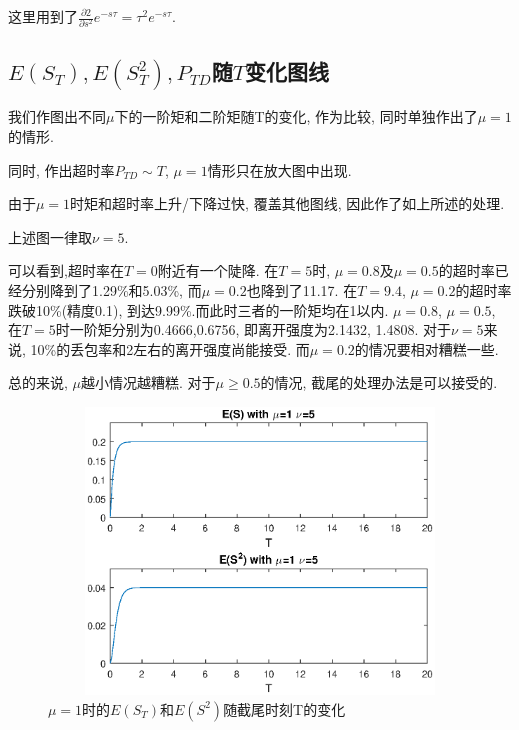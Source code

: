 \documentclass[a4paper, 12pt]{ctexart}
\begin{document}
这里用到了$\frac{\partial2}{\partial s^2}e^{-s\tau}=\tau^2e^{-s\tau}$.

\subsection{$E(S_T), E(S_T^2), P_{TD}$随$T$变化图线}

我们作图出不同$\mu$下的一阶矩和二阶矩随T的变化, 作为比较, 同时单独作出了$\mu=1$的情形. 

同时, 作出超时率$P_{TD}\sim T$, $\mu=1$情形只在放大图中出现. 

由于$\mu=1$时矩和超时率上升/下降过快, 覆盖其他图线, 因此作了如上所述的处理.

上述图一律取$\nu=5$.

可以看到,超时率在$T=0$附近有一个陡降. 在$T=5$时, $\mu=0.8$及$\mu=0.5$的超时率已经分别降到了1.29\%和5.03\%, 而$\mu=0.2$也降到了11.17. 在$T=9.4$, $\mu=0.2$的超时率跌破10\%(精度0.1), 到达9.99\%.而此时三者的一阶矩均在1以内. $\mu =0.8$, $\mu=0.5$, 在$T=5$时一阶矩分别为0.4666,0.6756, 即离开强度为2.1432, 1.4808. 对于$\nu=5$来说, 10\%的丢包率和2左右的离开强度尚能接受. 而$\mu=0.2$的情况要相对糟糕一些.  

总的来说, $\mu$越小情况越糟糕. 对于$\mu\geq 0.5$的情况, 截尾的处理办法是可以接受的.



\begin{figure}[H]
\centering
\includegraphics[width=5in,height=3in]{ES_mu_1.eps}
\caption{$\mu =1$时的$E(S_T)$和$E(S^2)$随截尾时刻T的变化}
\label{fig:3}
\end{figure}
\bigskip
\end{document}
